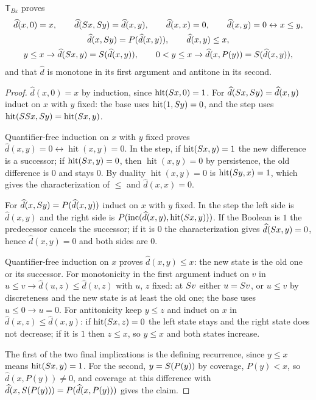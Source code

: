 \begin{lemma}[Difference]\label{seed:lem:tbe-diff}
$\mathsf{T}_{B\varepsilon}$ proves
\begin{gather*}
 \widehat d(x,0)=x,\qquad\widehat d(S x,S y)=\widehat d(x,y),\qquad
 \widehat d(x,x)=0,\qquad\widehat d(x,y)=0\leftrightarrow x\leq y,\\
 \widehat d(x,S y)=P(\widehat d(x,y)),\qquad\widehat d(x,y)\leq x,\\
 y\leq x\to\widehat d(S x,y)=S(\widehat d(x,y)),\qquad
 0<y\leq x\to\widehat d(x,P(y))=S(\widehat d(x,y)),
\end{gather*}
and that $\widehat d$ is monotone in its first argument and antitone in its
second.
\end{lemma}

\begin{proof}
$\widehat d(x,0)=x$ by induction, since $\operatorname{hit}(S x,0)=1$.
For $\widehat d(S x,S y)=\widehat d(x,y)$ induct on $x$ with $y$
fixed: the base uses $\operatorname{hit}(1,S y)=0$, and the step uses
$\operatorname{hit}(SS x,S y)=\operatorname{hit}(S x,y)$.

Quantifier-free induction on $x$ with $y$ fixed proves
$\widehat d(x,y)=0\leftrightarrow\operatorname{hit}(x,y)=0$. In the step, if
$\operatorname{hit}(S x,y)=1$ the new difference is a successor; if
$\operatorname{hit}(S x,y)=0$, then $\operatorname{hit}(x,y)=0$ by
persistence, the old difference is $0$ and stays $0$. By duality
$\operatorname{hit}(x,y)=0$ is $\operatorname{hit}(S y,x)=1$, which gives
the characterization of $\leq$ and $\widehat d(x,x)=0$.

For $\widehat d(x,S y)=P(\widehat d(x,y))$ induct on $x$ with $y$ fixed.
In the step the left side is $\widehat d(x,y)$ and the right side is
$P(\operatorname{inc}(\widehat d(x,y),\operatorname{hit}(S x,y)))$. If
the Boolean is $1$ the predecessor cancels the successor; if it is $0$ the
characterization gives $\widehat d(S x,y)=0$, hence
$\widehat d(x,y)=0$ and both sides are $0$.

Quantifier-free induction on $x$ proves $\widehat d(x,y)\leq x$: the new
state is the old one or its successor. For monotonicity in the first
argument induct on $v$ in
$u\leq v\to\widehat d(u,z)\leq\widehat d(v,z)$ with $u$, $z$ fixed: at
$S v$ either $u=S v$, or $u\leq v$ by discreteness and the new state
is at least the old one; the base uses $u\leq0\to u=0$. For antitonicity keep
$y\leq z$ and induct on $x$ in $\widehat d(x,z)\leq\widehat d(x,y)$: if
$\operatorname{hit}(S x,z)=0$ the left state stays and the right state
does not decrease; if it is $1$ then $z\leq x$, so $y\leq x$ and both states
increase.

The first of the two final implications is the defining recurrence, since
$y\leq x$ means $\operatorname{hit}(S x,y)=1$. For the second,
$y=S(P(y))$ by coverage, $P(y)<x$, so $\widehat d(x,P(y))\neq0$, and
coverage at this difference with
$\widehat d(x,S(P(y)))=P(\widehat d(x,P(y)))$ gives the claim.
\end{proof}

